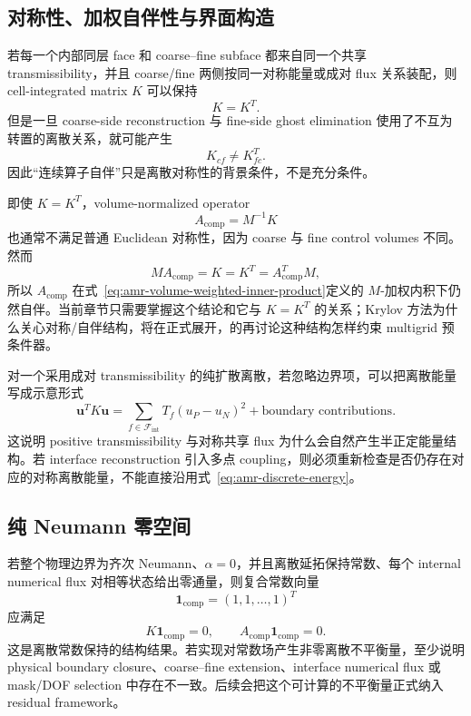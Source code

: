 \subsection{对称性、加权自伴性与界面构造}

若每一个内部同层 face 和 coarse--fine subface 都来自同一个共享 transmissibility，并且 coarse/fine 两侧按同一对称能量或成对 flux 关系装配，则 cell-integrated matrix $K$ 可以保持
\begin{equation}
K=K^T.
\end{equation}
但是一旦 coarse-side reconstruction 与 fine-side ghost elimination 使用了不互为转置的离散关系，就可能产生
\begin{equation}
K_{cf}\neq K_{fc}^T.
\end{equation}
因此“连续算子自伴”只是离散对称性的背景条件，不是充分条件。

即使 $K=K^T$，volume-normalized operator
\begin{equation}
A_{\mathrm{comp}}=M^{-1}K
\end{equation}
也通常不满足普通 Euclidean 对称性，因为 coarse 与 fine control volumes 不同。然而
\begin{equation}
MA_{\mathrm{comp}}=K=K^T=A_{\mathrm{comp}}^TM,
\end{equation}
所以 $A_{\mathrm{comp}}$ 在式~\eqref{eq:amr-volume-weighted-inner-product}定义的 $M$-加权内积下仍然自伴。当前章节只需要掌握这个结论和它与 $K=K^T$ 的关系；Krylov 方法为什么关心对称/自伴结构，将在正式展开，的再讨论这种结构怎样约束 multigrid 预条件器。

对一个采用成对 transmissibility 的纯扩散离散，若忽略边界项，可以把离散能量写成示意形式
\begin{equation}
\bm u^TK\bm u
=\sum_{f\in\mathcal F_{\mathrm{int}}}
T_f(u_P-u_N)^2
+\text{boundary contributions}.
\label{eq:amr-discrete-energy}
\end{equation}
这说明 positive transmissibility 与对称共享 flux 为什么会自然产生半正定能量结构。若 interface reconstruction 引入多点 coupling，则必须重新检查是否仍存在对应的对称离散能量，不能直接沿用式~\eqref{eq:amr-discrete-energy}。

\subsection{纯 Neumann 零空间}

若整个物理边界为齐次 Neumann、$\alpha=0$，并且离散延拓保持常数、每个 internal numerical flux 对相等状态给出零通量，则复合常数向量
\begin{equation}
\bm 1_{\mathrm{comp}}=(1,1,\ldots,1)^T
\end{equation}
应满足
\begin{equation}
\boxed{
K\bm1_{\mathrm{comp}}=0,
\qquad
A_{\mathrm{comp}}\bm1_{\mathrm{comp}}=0.
}
\label{eq:amr_constant_nullspace}
\end{equation}
这是离散常数保持的结构结果。若实现对常数场产生非零离散不平衡量，至少说明 physical boundary closure、coarse--fine extension、interface numerical flux 或 mask/DOF selection 中存在不一致。后续会把这个可计算的不平衡量正式纳入 residual framework。

